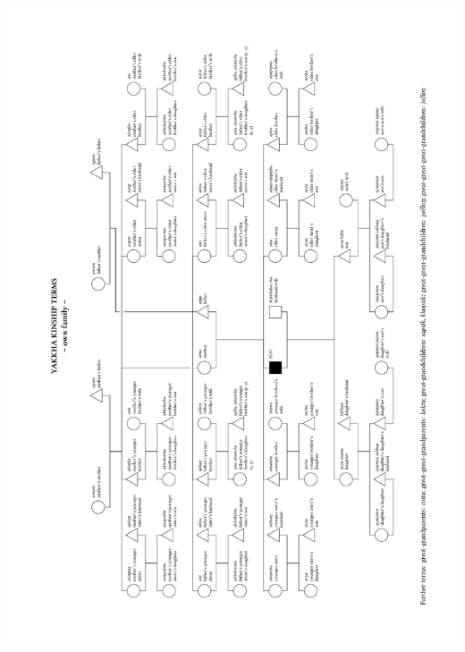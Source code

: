 \documentclass[output=coverbod             %
		,biblatex
		  ]{LSP/langsci}
\begin{document}
  \vspace*{\fill}
  \includegraphics[height=.88\textheight]{figures/90Grad_Verwandtschaft_eigeneFamilie_zum_Einbinden.pdf} 
  \newpage
  \vspace*{\fill}
\end{document}
